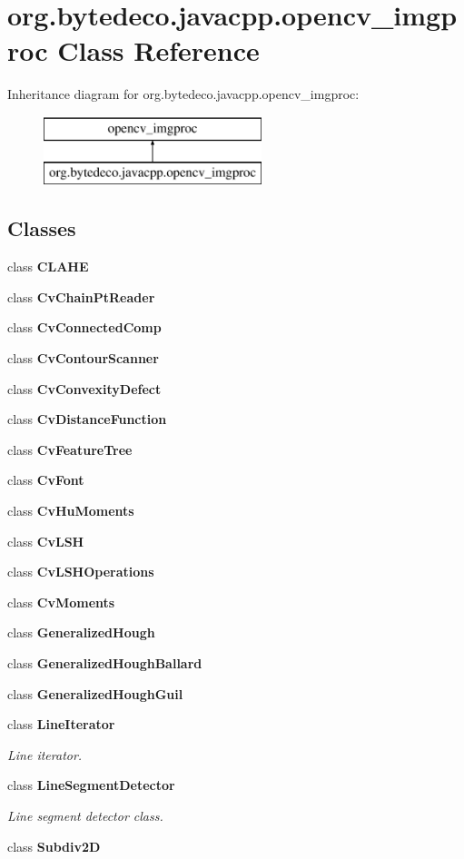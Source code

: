 \hypertarget{classorg_1_1bytedeco_1_1javacpp_1_1opencv__imgproc}{}\section{org.\+bytedeco.\+javacpp.\+opencv\+\_\+imgproc Class Reference}
\label{classorg_1_1bytedeco_1_1javacpp_1_1opencv__imgproc}
Inheritance diagram for org.\+bytedeco.\+javacpp.\+opencv\+\_\+imgproc\+:\begin{figure}[H]
\begin{center}
\leavevmode
\includegraphics[height=2.000000cm]{classorg_1_1bytedeco_1_1javacpp_1_1opencv__imgproc}
\end{center}
\end{figure}
\subsection*{Classes}
\begin{DoxyCompactItemize}
\item 
class {\bfseries C\+L\+A\+HE}
\item 
class {\bfseries Cv\+Chain\+Pt\+Reader}
\item 
class {\bfseries Cv\+Connected\+Comp}
\item 
class {\bfseries Cv\+Contour\+Scanner}
\item 
class {\bfseries Cv\+Convexity\+Defect}
\item 
class {\bfseries Cv\+Distance\+Function}
\item 
class {\bfseries Cv\+Feature\+Tree}
\item 
class {\bfseries Cv\+Font}
\item 
class {\bfseries Cv\+Hu\+Moments}
\item 
class {\bfseries Cv\+L\+SH}
\item 
class {\bfseries Cv\+L\+S\+H\+Operations}
\item 
class {\bfseries Cv\+Moments}
\item 
class {\bfseries Generalized\+Hough}
\item 
class {\bfseries Generalized\+Hough\+Ballard}
\item 
class {\bfseries Generalized\+Hough\+Guil}
\item 
class {\bfseries Line\+Iterator}
\begin{DoxyCompactList}\small\item\em Line iterator. \end{DoxyCompactList}\item 
class {\bfseries Line\+Segment\+Detector}
\begin{DoxyCompactList}\small\item\em Line segment detector class. \end{DoxyCompactList}\item 
class {\bfseries Subdiv2D}
\end{DoxyCompactItemize}
